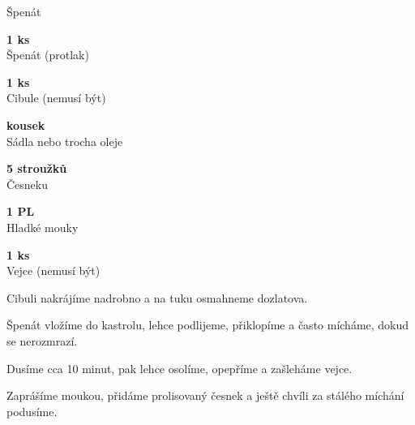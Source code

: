 \documentclass[11pt,a4paper]{article}
\begin{document}
\begin{recipe}[LimeGreen]{Špenát}
    \begin{ingredients}
        \item \parbox[t]{\linewidth}{\raggedright \piece \textbf{1 ks}\\ Špenát (protlak)}
        \item \parbox[t]{\linewidth}{\raggedright \piece \textbf{1 ks}\\ Cibule (nemusí být)}
        \item \parbox[t]{\linewidth}{\raggedright \indefinite \textbf{kousek}\\ Sádla nebo trocha oleje}
        \item \parbox[t]{\linewidth}{\raggedright \piece \textbf{5 stroužků}\\ Česneku}
        \item \parbox[t]{\linewidth}{\raggedright \spoon \textbf{1 PL}\\ Hladké mouky}
        \item \parbox[t]{\linewidth}{\raggedright \piece \textbf{1 ks}\\ Vejce (nemusí být)}
    \end{ingredients}
    \begin{steps}
        \item Cibuli nakrájíme nadrobno a na tuku osmahneme dozlatova.
        \item Špenát vložíme do kastrolu, lehce podlijeme, přiklopíme a často mícháme, dokud se nerozmrazí.
        \item Dusíme cca 10 minut, pak lehce osolíme, opepříme a zašleháme vejce.
        \item Zaprášíme moukou, přidáme prolisovaný česnek a ještě chvíli za stálého míchání podusíme.
    \end{steps}
\end{recipe}

\end{document}
